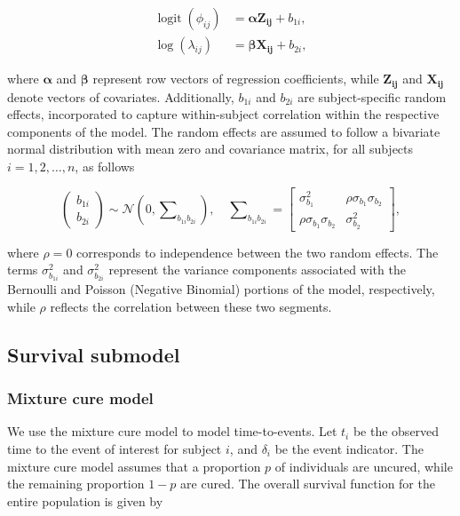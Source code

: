 \documentclass[twoside]{article}
\begin{document}
\begin{align}
\operatorname{logit}(\phi_{ij}) &= \bm{\alpha} \bm{Z_{ij}} + b_{1i},\\
\log(\lambda_{ij}) &= \bm{\beta} \bm{X_{ij}} + b_{2i},
\end{align}

where \( \bm{\alpha} \) and \( \bm{\beta} \) represent row vectors of regression coefficients, while \( \bm{Z_{ij}} \) and \( \bm{X_{ij}} \) denote vectors of covariates. Additionally, \( b_{1i} \) and \( b_{2i} \) are subject-specific random effects, incorporated to capture within-subject correlation within the respective components of the model. The random effects are assumed to follow a bivariate normal distribution with mean zero and covariance matrix, for all subjects \( i = 1, 2, \ldots, n \), as follows

\[
\begin{pmatrix} b_{1i} \\ b_{2i} \end{pmatrix} \sim \mathcal{N}\left(0, \sum\nolimits_{b_{1i}b_{2i}}\right), \quad \sum\nolimits_{b_{1i}b_{2i}} = \begin{bmatrix} \sigma_{b_{1}}^{2} & \rho \sigma_{b_{1}} \sigma_{b_{2}} \\ \rho \sigma_{b_{1}} \sigma_{b_{2}} & \sigma_{b_{2}}^{2} \end{bmatrix},
\]

where \( \rho = 0 \) corresponds to independence between the two random effects. The terms \( \sigma_{b_{1i}}^{2} \) and \( \sigma_{b_{2i}}^{2} \) represent the variance components associated with the Bernoulli and Poisson (Negative Binomial) portions of the model, respectively, while \( \rho \) reflects the correlation between these two segments.

\subsection{Survival submodel}

\subsubsection{Mixture cure model}

We use the mixture cure model to model time-to-events. Let \( t_i \) be the observed time to the event of interest for subject \( i \), and \( \delta_i \) be the event indicator. The mixture cure model assumes that a proportion \( p \) of individuals are uncured, while the remaining proportion \( 1 - p \) are cured. The overall survival function for the entire population is given by
\end{document}
